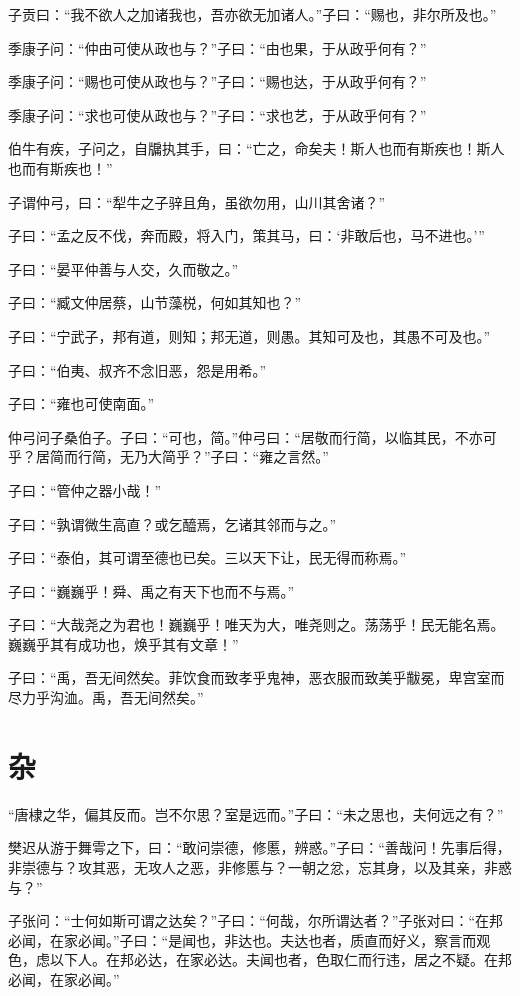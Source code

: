 \documentclass[a5paper]{ctexbook}
\begin{document}
    子贡曰：“我不欲人之加诸我也，吾亦欲无加诸人。”子曰：“赐也，非尔所及也。”

    季康子问：“仲由可使从政也与？”子曰：“由也果，于从政乎何有？”
    
    季康子问：“赐也可使从政也与？”子曰：“赐也达，于从政乎何有？”
    
    季康子问：“求也可使从政也与？”子曰：“求也艺，于从政乎何有？”

    伯牛有疾，子问之，自牖执其手，曰：“亡之，命矣夫！斯人也而有斯疾也！斯人也而有斯疾也！”

    子谓仲弓，曰：“犁牛之子骍且角，虽欲勿用，山川其舍诸？”

    子曰：“孟之反不伐，奔而殿，将入门，策其马，曰：‘非敢后也，马不进也。’”

    子曰：“晏平仲善与人交，久而敬之。”

    子曰：“臧文仲居蔡，山节藻棁，何如其知也？”

    子曰：“宁武子，邦有道，则知；邦无道，则愚。其知可及也，其愚不可及也。”

    子曰：“伯夷、叔齐不念旧恶，怨是用希。”

    子曰：“雍也可使南面。”

    仲弓问子桑伯子。子曰：“可也，简。”仲弓曰：“居敬而行简，以临其民，不亦可乎？居简而行简，无乃大简乎？”子曰：“雍之言然。”

    子曰：“管仲之器小哉！”

    子曰：“孰谓微生高直？或乞醯焉，乞诸其邻而与之。”

    子曰：“泰伯，其可谓至德也已矣。三以天下让，民无得而称焉。”

    子曰：“巍巍乎！舜、禹之有天下也而不与焉。”

    子曰：“大哉尧之为君也！巍巍乎！唯天为大，唯尧则之。荡荡乎！民无能名焉。巍巍乎其有成功也，焕乎其有文章！”

    子曰：“禹，吾无间然矣。菲饮食而致孝乎鬼神，恶衣服而致美乎黻冕，卑宫室而尽力乎沟洫。禹，吾无间然矣。”

    \chapter{杂}

    “唐棣之华，偏其反而。岂不尔思？室是远而。”子曰：“未之思也，夫何远之有？”

    樊迟从游于舞雩之下，曰：“敢问崇德，修慝，辨惑。”子曰：“善哉问！先事后得，非崇德与？攻其恶，无攻人之恶，非修慝与？一朝之忿，忘其身，以及其亲，非惑与？”

    子张问：“士何如斯可谓之达矣？”子曰：“何哉，尔所谓达者？”子张对曰：“在邦必闻，在家必闻。”子曰：“是闻也，非达也。夫达也者，质直而好义，察言而观色，虑以下人。在邦必达，在家必达。夫闻也者，色取仁而行违，居之不疑。在邦必闻，在家必闻。”
\end{document}

